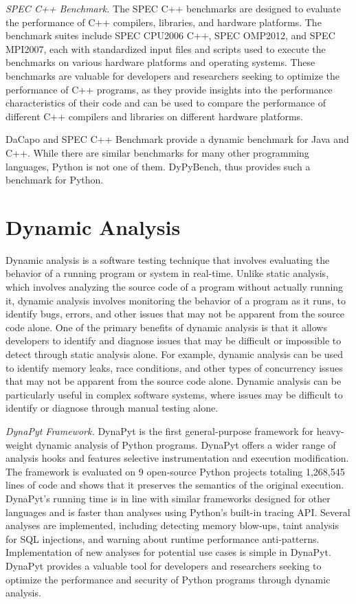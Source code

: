 \textit{SPEC C++ Benchmark.} The SPEC C++ benchmarks are designed to evaluate the performance of C++ compilers, libraries, and hardware platforms. The benchmark suites include SPEC CPU2006 C++, SPEC OMP2012, and SPEC MPI2007, each with standardized input files and scripts used to execute the benchmarks on various hardware platforms and operating systems. These benchmarks are valuable for developers and researchers seeking to optimize the performance of C++ programs, as they provide insights into the performance characteristics of their code and can be used to compare the performance of different C++ compilers and libraries on different hardware platforms. \cite{SPEC_C++_2006, SPEC_OMP_2012, SPEC_MPI_2007}

DaCapo and SPEC C++ Benchmark provide a dynamic benchmark for Java and C++. While there are similar benchmarks for many other programming languages, Python is not one of them. DyPyBench, thus provides such a benchmark for Python.    

\section{Dynamic Analysis}
Dynamic analysis is a software testing technique that involves evaluating the behavior of a running program or system in real-time.
Unlike static analysis, which involves analyzing the source code of a program without actually running it, dynamic analysis involves monitoring the behavior of a program as it runs, to identify bugs, errors, and other issues that may not be apparent from the source code alone.
One of the primary benefits of dynamic analysis is that it allows developers to identify and diagnose issues that may be difficult or impossible to detect through static analysis alone.
For example, dynamic analysis can be used to identify memory leaks, race conditions, and other types of concurrency issues that may not be apparent from the source code alone.
Dynamic analysis can be particularly useful in complex software systems, where issues may be difficult to identify or diagnose through manual testing alone.
\cite{dynamic_analysis}

\textit{DynaPyt Framework.} DynaPyt is the first general-purpose framework for heavy-weight dynamic analysis of Python programs. DynaPyt offers a wider range of analysis hooks and features selective instrumentation and execution modification. The framework is evaluated on 9 open-source Python projects totaling 1,268,545 lines of code and shows that it preserves the semantics of the original execution. DynaPyt's running time is in line with similar frameworks designed for other languages and is faster than analyses using Python's built-in tracing API. Several analyses are implemented, including detecting memory blow-ups, taint analysis for SQL injections, and warning about runtime performance anti-patterns. Implementation of new analyses for potential use cases is simple in DynaPyt. DynaPyt provides a valuable tool for developers and researchers seeking to optimize the performance and security of Python programs through dynamic analysis. \cite{DynaPyt2022}

